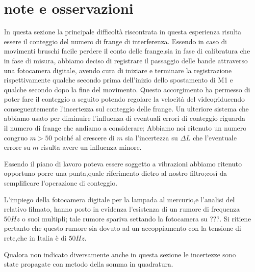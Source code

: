 \section{note e osservazioni}
In questa sezione la principale difficoltà
riscontrata in questa esperienza risulta essere il conteggio del
numero di frange di interferenza.
Essendo in caso di movimenti bruschi facile
perdere il conto delle frange,sia in fase di 
calibratura che in fase di misura, abbiamo deciso di registrare 
il passaggio delle bande attraverso una fotocamera digitale,
avendo cura di iniziare e terminare la registrazione rispettivamente qualche 
secondo prima dell'inizio dello spostamento di M1
e qualche secondo dopo la fine del movimento.
Questo accorgimento ha permesso di poter fare il conteggio a seguito
potendo regolare la velocità del video;riducendo conseguentemente l'incertezza 
sul conteggio delle frange.
Un ulteriore sistema che abbiamo usato per diminuire l'influenza 
di eventuali errori di conteggio riguarda il numero di frange che andiamo a 
considerare;
Abbiamo noi ritenuto un numero congruo $m> 50$
poiché al crescere di $m$ sia l'incertezza su $\Delta L$ che l'eventuale 
errore su $m$ risulta avere un influenza minore.

Essendo il piano di lavoro poteva essere soggetto a vibrazioni
abbiamo ritenuto opportuno porre una punta,quale riferimento dietro al nostro
filtro;così da semplificare l'operazione di conteggio.

L'impiego della fotocamera digitale per la lampada al mercurio,e l'analisi del
relativo filmato, 
hanno posto in evidenza l'esistenza di un rumore di frequenza $50 Hz$ o 
suoi multipli; tale rumore spariva settando la fotocamera su ???.
Si ritiene pertanto che questo rumore sia dovuto  ad un accoppiamento con 
la tensione di rete,che in Italia è di $50 Hz$. 

Qualora non indicato diversamente anche in questa sezione le incertezze sono 
state propagate
con metodo della somma in quadratura.